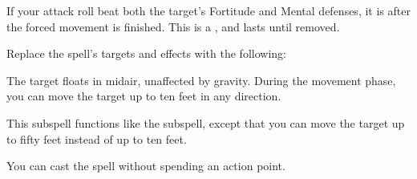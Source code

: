 
If your attack roll beat both the target's Fortitude and Mental defenses, it is \immobilized after the forced movement is finished.
This is a , and lasts until removed.









Replace the spell's targets and effects with the following:
\begin{spellcontent}

\begin{augmenttargetinginfo}




\end{augmenttargetinginfo}


\begin{augmenteffects}



\spelleffect
The target floats in midair, unaffected by gravity.
During the movement phase, you can move the target up to ten feet in any direction.








\end{augmenteffects}

\end{spellcontent}






This subspell functions like the  subspell, except that you can move the target up to fifty feet instead of up to ten feet.






You can cast the spell without spending an action point.




